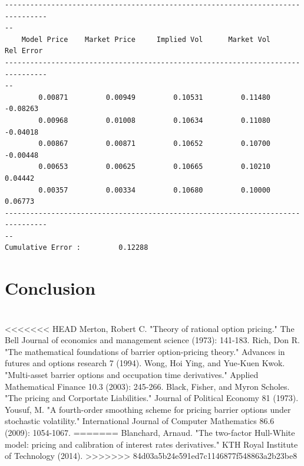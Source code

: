 \documentclass[11pt]{article}
\begin{document}
    \begin{Verbatim}[commandchars=\\\{\}]
--------------------------------------------------------------------------------
--
    Model Price    Market Price     Implied Vol      Market Vol       Rel Error
--------------------------------------------------------------------------------
--
        0.00871         0.00949         0.10531         0.11480        -0.08263
        0.00968         0.01008         0.10634         0.11080        -0.04018
        0.00867         0.00871         0.10652         0.10700        -0.00448
        0.00653         0.00625         0.10665         0.10210         0.04442
        0.00357         0.00334         0.10680         0.10000         0.06773
--------------------------------------------------------------------------------
--
Cumulative Error :         0.12288
    \end{Verbatim}

\section{Conclusion}



\newpage
\section*{} \label{bibsection}


\begin{thebibliography}{MMMMM} 
<<<<<<< HEAD
 Merton, Robert C. "Theory of rational option pricing." The Bell Journal of economics and management science (1973): 141-183.
 Rich, Don R. "The mathematical foundations of barrier option-pricing theory." Advances in futures and options research 7 (1994).
 Wong, Hoi Ying, and Yue‐Kuen Kwok. "Multi-asset barrier options and occupation time derivatives." Applied Mathematical Finance 10.3 (2003): 245-266.
Black, Fisher, and Myron Scholes. "The pricing and Corportate Liabilities." Journal of Political Economy 81 (1973).
 Yousuf, M. "A fourth-order smoothing scheme for pricing barrier options under stochastic volatility." International Journal of Computer Mathematics 86.6 (2009): 1054-1067.
=======
 Blanchard, Arnaud. "The two-factor Hull-White model: pricing and calibration of interest rates derivatives." KTH Royal Institute of Technology (2014).
>>>>>>> 84d03a5b24e591ed7c1146877f548863a2b23be8


\end{thebibliography}


\end{document}
